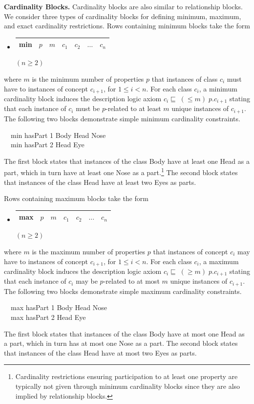 \documentclass[5p,authoryear]{elsarticle}
\newcommand{\myblock}[1]{\vspace{12pt}\noindent\textbf{#1}}
\begin{document}
\myblock{Cardinality Blocks.} Cardinality blocks are also similar to
relationship blocks.  We consider three types of cardinality blocks
for defining minimum, maximum, and exact cardinality restrictions.
Rows containing minimum blocks take the form
\begin{itemize}
\item[]
  \begin{tabular}{|l|l|l|l|l|l|l|}\hline \textsf{min} & $p$ & $m$ & 
    $c_1$ & $c_2$ & $\dots$ & $c_n$
    \\ \hline 
  \end{tabular} \hfill $(n \ge 2)$
\end{itemize}
where $m$ is the minimum number of properties $p$ that instances of
class $c_i$ must have to instances of concept $c_{i+1}$, for $1 \le i
< n$.  For each class $c_i$, a minimum cardinality block induces the
description logic axiom $c_{i} \sqsubseteq \; (\le m) \; p.c_{i+1}$
stating that each instance of $c_i$ must be $p$-related to at least
$m$ unique instances of $c_{i+1}$. The following two blocks
demonstrate simple minimum cardinality constraints.
\begin{tabbing}
  ~~\textsf{min} \textsf{hasPart} 1 \textsf{Body} \textsf{Head} 
  \textsf{Nose} \\
  ~~\textsf{min} \textsf{hasPart} 2 \textsf{Head} \textsf{Eye}
\end{tabbing}
The first block states that instances of the class Body have at least
one Head as a part, which in turn have at least one Nose as a
part.\footnote{Cardinality restrictions ensuring participation to at
  least one property are typically not given through minimum
  cardinality blocks since they are also implied by relationship
  blocks.} The second block states that instances of the class Head
have at least two Eyes as parts. 

Rows containing maximum blocks take the form
\begin{itemize}
\item[]
  \begin{tabular}{|l|l|l|l|l|l|l|}\hline \textsf{max} & $p$ & $m$ & 
    $c_1$ & $c_2$ & $\dots$ & $c_n$
    \\ \hline
  \end{tabular} \hfill $(n \ge 2)$
\end{itemize}
where $m$ is the maximum number of properties $p$ that instances of
concept $c_i$ may have to instances of concept $c_{i+1}$, for $1 \le i
< n$.  For each class $c_i$, a maximum cardinality block induces the
description logic axiom $c_i \sqsubseteq \; (\ge m) \; p.c_{i+1}$
stating that each instance of $c_i$ may be $p$-related to at most $m$
unique instances of $c_{i+1}$. The following two blocks demonstrate
simple maximum cardinality constraints.
\begin{tabbing}
  ~~\textsf{max} \textsf{hasPart} 1 \textsf{Body} \textsf{Head} 
  \textsf{Nose} \\
  ~~\textsf{max} \textsf{hasPart} 2 \textsf{Head} \textsf{Eye}
\end{tabbing}
The first block states that instances of the class Body have at most
one Head as a part, which in turn has at most one Nose as a part. The
second block states that instances of the class Head have at most two
Eyes as parts. 
\end{document}
